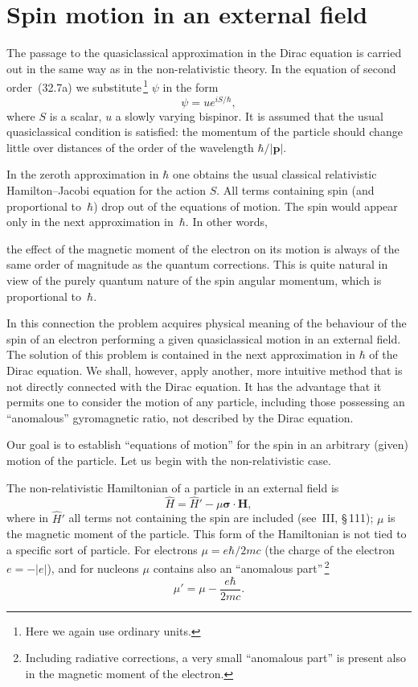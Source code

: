 \section{Spin motion in an external field}

The passage to the quasiclassical approximation in the Dirac equation is carried out in the same way as in the non-relativistic theory. In the equation of second order~(32.7a) we substitute\,\footnote{Here we again use ordinary units.} $\psi$ in the form
\[
\psi = ue^{iS/\hbar},
\]
where $S$ is a scalar, $u$ a slowly varying bispinor. It is assumed that the usual quasiclassical condition is satisfied: the momentum of the particle should change little over distances of the order of the wavelength $\hbar/|\mathbf{p}|$.

In the zeroth approximation in $\hbar$ one obtains the usual classical relativistic Hamilton--Jacobi equation for the action $S$. All terms containing spin (and proportional to~$\hbar$) drop out of the equations of motion. The spin would appear only in the next approximation in~$\hbar$. In other words,

the effect of the magnetic moment of the electron on its motion is always of the same order of magnitude as the quantum corrections. This is quite natural in view of the purely quantum nature of the spin angular momentum, which is proportional to~$\hbar$.

In this connection the problem acquires physical meaning of the behaviour of the spin of an electron performing a given quasiclassical motion in an external field. The solution of this problem is contained in the next approximation in $\hbar$ of the Dirac equation. We shall, however, apply another, more intuitive method that is not directly connected with the Dirac equation. It has the advantage that it permits one to consider the motion of any particle, including those possessing an ``anomalous'' gyromagnetic ratio, not described by the Dirac equation.

Our goal is to establish ``equations of motion'' for the spin in an arbitrary (given) motion of the particle. Let us begin with the non-relativistic case.

The non-relativistic Hamiltonian of a particle in an external field is
\begin{equation}
\widehat H = \widehat H' - \mu\boldsymbol{\sigma}\cdot\mathbf{H},
\tag{41.1}
\end{equation}
where in $\widehat H'$ all terms not containing the spin are included (see~III, \S\,111); $\mu$ is the magnetic moment of the particle. This form of the Hamiltonian is not tied to a specific sort of particle. For electrons $\mu = e\hbar/2mc$ (the charge of the electron $e = -|e|$), and for nucleons $\mu$ contains also an ``anomalous part''\,\footnote{Including radiative corrections, a very small ``anomalous part'' is present also in the magnetic moment of the electron.}
\begin{equation}
\mu' = \mu - \frac{e\hbar}{2mc}.
\tag{41.2}
\end{equation}

